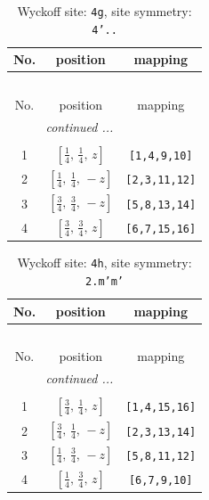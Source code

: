 \documentclass[fleqn,8pt]{jsarticle}
\begin{document}
\renewcommand{\arraystretch}{1.2}
\begin{longtable}{ccc}
\caption{Wyckoff site: {\tt 4g}, site symmetry: {\tt 4'..}}
 \\
 \hline \hline
No. & position & mapping \\ \hline \endfirsthead

\multicolumn{2}{l}{\tablename\ \thetable{}} \\
 \hline \hline
No. & position & mapping \\ \hline \endhead

 \hline \hline
\multicolumn{2}{r}{\footnotesize\it continued ...} \\ \endfoot

 \hline \hline
\multicolumn{2}{r}{} \\ \endlastfoot

1 & $\left[ \frac{1}{4},\, \frac{1}{4},\, z \right]$ & {\tt [1,4,9,10]} \\ \hline
2 & $\left[ \frac{1}{4},\, \frac{1}{4},\, - z \right]$ & {\tt [2,3,11,12]} \\ \hline
3 & $\left[ \frac{3}{4},\, \frac{3}{4},\, - z \right]$ & {\tt [5,8,13,14]} \\ \hline
4 & $\left[ \frac{3}{4},\, \frac{3}{4},\, z \right]$ & {\tt [6,7,15,16]} \\
\end{longtable}
\renewcommand{\arraystretch}{1.2}
\begin{longtable}{ccc}
\caption{Wyckoff site: {\tt 4h}, site symmetry: {\tt 2.m'm'}}
 \\
 \hline \hline
No. & position & mapping \\ \hline \endfirsthead

\multicolumn{2}{l}{\tablename\ \thetable{}} \\
 \hline \hline
No. & position & mapping \\ \hline \endhead

 \hline \hline
\multicolumn{2}{r}{\footnotesize\it continued ...} \\ \endfoot

 \hline \hline
\multicolumn{2}{r}{} \\ \endlastfoot

1 & $\left[ \frac{3}{4},\, \frac{1}{4},\, z \right]$ & {\tt [1,4,15,16]} \\ \hline
2 & $\left[ \frac{3}{4},\, \frac{1}{4},\, - z \right]$ & {\tt [2,3,13,14]} \\ \hline
3 & $\left[ \frac{1}{4},\, \frac{3}{4},\, - z \right]$ & {\tt [5,8,11,12]} \\ \hline
4 & $\left[ \frac{1}{4},\, \frac{3}{4},\, z \right]$ & {\tt [6,7,9,10]} \\
\end{longtable}
\end{document}
